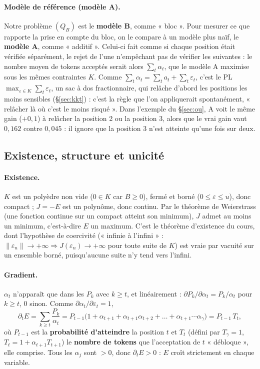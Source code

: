 \documentclass[11pt,a4paper]{article}
\newcommand{\nr}[1]{\|#1\|}
\theoremstyle{plain}
\theoremstyle{definition}
\begin{document}
\paragraph{Modèle de référence (modèle A).} Notre problème $(Q_B)$ est le \textbf{modèle B}, comme « bloc ». Pour mesurer ce que rapporte la prise en compte du bloc, on le compare à un modèle plus naïf, le \textbf{modèle A}, comme « additif ». Celui-ci fait comme si chaque position était vérifiée séparément, le rejet de l'une n'empêchant pas de vérifier les suivantes : le nombre moyen de tokens acceptés serait alors $\sum_t\alpha_t$, que le modèle A maximise sous les mêmes contraintes $K$. Comme $\sum_t\alpha_t=\sum_ta_t+\sum_t\varepsilon_t$, c'est le PL $\max_{\varepsilon\in K}\sum_t\varepsilon_t$, un sac à dos fractionnaire, qui relâche d'abord les positions les moins sensibles (§\ref{sec:kkt}) : c'est la règle que l'on appliquerait spontanément, « relâcher là où c'est le moins risqué ». Dans l'exemple du §\ref{sec:ou}, A voit le même gain ($+0{,}1$) à relâcher la position 2 ou la position 3, alors que le vrai gain vaut $0{,}162$ contre $0{,}045$ : il ignore que la position 3 n'est atteinte qu'une fois sur deux.


\subsection{Existence, structure et unicité}\label{sec:existenceII}
\paragraph{Existence.} $K$ est un polyèdre non vide ($0\in K$ car $B\ge0$), fermé et borné ($0\le\varepsilon\le u$), donc compact ; $J=-E$ est un polynôme, donc continu. Par le théorème de Weierstrass (une fonction continue sur un compact atteint son minimum), $J$ admet au moins un minimum, c'est-à-dire $E$ un maximum. C'est le théorème d'existence du cours, dont l'hypothèse de coercivité (« infinie à l'infini » : $\nr{\varepsilon_n}\to+\infty\Rightarrow J(\varepsilon_n)\to+\infty$ pour toute suite de $K$) est vraie par vacuité sur un ensemble borné, puisqu'aucune suite n'y tend vers l'infini.

\paragraph{Gradient.} $\alpha_t$ n'apparaît que dans les $P_k$ avec $k\ge t$, et linéairement : $\partial P_k/\partial\alpha_t=P_k/\alpha_t$ pour $k\ge t$, $0$ sinon. Comme $\partial\alpha_t/\partial\varepsilon_t=1$,
\[\partial_tE=\sum_{k\ge t}\frac{P_k}{\alpha_t}=P_{t-1}\big(1+\alpha_{t+1}+\alpha_{t+1}\alpha_{t+2}+\dots+\alpha_{t+1}\cdots\alpha_\gamma\big)=P_{t-1}\,T_t,\]
où $P_{t-1}$ est la \textbf{probabilité d'atteindre} la position $t$ et $T_t$ (défini par $T_\gamma=1$, $T_t=1+\alpha_{t+1}T_{t+1}$) le \textbf{nombre de tokens} que l'acceptation de $t$ « débloque », elle comprise. Tous les $\alpha_j$ sont $>0$, donc $\partial_tE>0$ : $E$ croît strictement en chaque variable.
\end{document}
